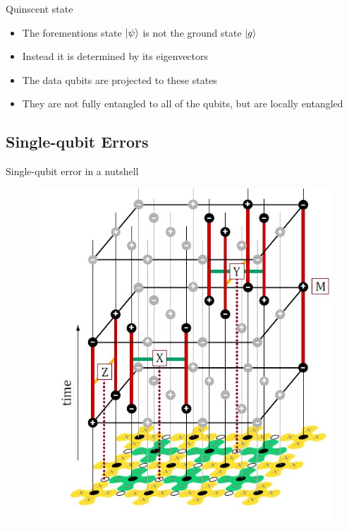 \documentclass{beamer}
\begin{document}
    \begin{frame}{Quinscent state}
        \begin{itemize}
            \item The forementions state $ \ket{\psi} $ is not the ground state $ \ket{g} $
            \item Instead it is determined by its eigenvectors
            \item The data qubits are projected to these states
            \item They are not fully entangled to all of the qubits, but are locally entangled
        \end{itemize}
    \end{frame}
    
    \subsection{Single-qubit Errors}
    \begin{frame}{Single-qubit error in a nutshell}
        \begin{figure}[h]
            \centering
            \includegraphics[height=0.8\textheight]{./Images/surf-code-single-error.jpg}
        \end{figure}
    \end{frame}
    
\end{document}

